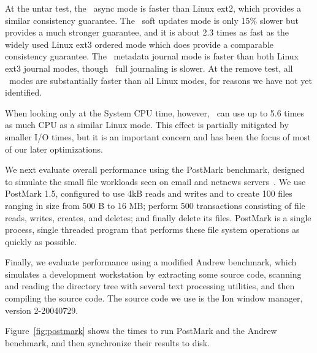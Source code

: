 At the untar test, the \Kudos\ async mode is faster than Linux ext2, which
provides a similar consistency guarantee. The \Kudos\ soft updates mode is
only 15\% slower but provides a much stronger guarantee, and it is about 2.3
times as fast as the widely used Linux ext3 ordered mode which does provide a
comparable consistency guarantee. The \Kudos\ metadata journal mode is faster
than both Linux ext3 journal modes, though \Kudos\ full journaling is slower.
At the remove test, all \Kudos\ modes are substantially faster than all Linux
modes, for reasons we have not yet identified.

When looking only at the System CPU time, however, \Kudos\ can use up to
5.6 times as much CPU as a similar Linux mode. This effect is partially
mitigated by smaller I/O times, but it is an important concern and has
been the focus of most of our later optimizations.

%
%

We next evaluate overall performance using the PostMark benchmark,
designed to simulate the small file workloads seen on email and
netnews servers~\cite{postmark}.
%
We use PostMark 1.5, configured to use 4kB reads and writes and to
create 100 files ranging in size from 500 B to 16 MB; perform 500
transactions consisting of file reads, writes, creates, and deletes;
and finally delete its files. PostMark is a single process, single
threaded program that performs these file system operations as quickly
as possible.

Finally, we evaluate performance using a modified Andrew benchmark,
which simulates a development workstation by extracting some source
code, scanning and reading the directory tree with several text
processing utilities, and then compiling the source code. The source
code we use is the Ion window manager, version 2-20040729.

Figure~\ref{fig:postmark} shows the times to run PostMark and the Andrew
benchmark, and then synchronize their results to disk.

